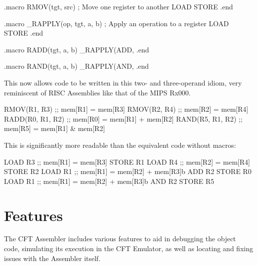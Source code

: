 \begin{cftasmcode}
.macro RMOV(tgt, src) ; Move one register to another
	LOAD %
	STORE %
.end

.macro _RAPPLY(op, tgt, a, b) ; Apply an operation to a register
	LOAD %
	STORE %
.end

.macro RADD(tgt, a, b)
	_RAPPLY(ADD, %
.end

.macro RAND(tgt, a, b)
	_RAPPLY(AND, %
.end
\end{cftasmcode}

This now allows code to be written in this two- and three-operand idiom, very
reminiscent of RISC Assemblies like that of the MIPS Rx000.

\begin{cftasmcode}
        RMOV(R1, R3)            ;; mem[R1] = mem[R3]
        RMOV(R2, R4)            ;; mem[R2] = mem[R4]
        RADD(R0, R1, R2)        ;; mem[R0] = mem[R1] + mem[R2]
        RAND(R5, R1, R2)        ;; mem[R5] = mem[R1] & mem[R2]
\end{cftasmcode}

This is significantly more readable than the equivalent code without macros:

\begin{cftasmcode}
        LOAD R3                 ;; mem[R1] = mem[R3]
        STORE R1
        LOAD R4                 ;; mem[R2] = mem[R4]
        STORE R2
        LOAD R1                 ;; mem[R1] = mem[R2] + mem[R3]b
        ADD R2
        STORE R0
        LOAD R1                 ;; mem[R1] = mem[R2] + mem[R3]b
        AND R2
        STORE R5
\end{cftasmcode}


\section{Features}

The CFT Assembler includes various features to aid in debugging the object
code, simulating its execution in the CFT Emulator, as well as locating and
fixing issues with the Assembler itself.

















